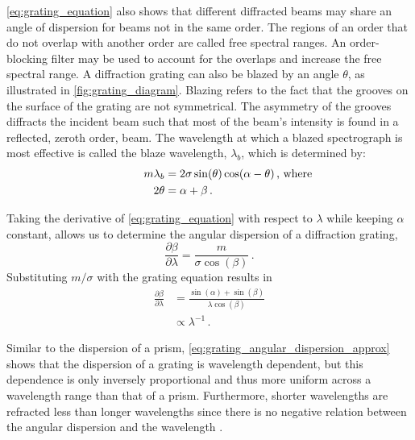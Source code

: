 \autoref{eq:grating_equation} also shows that different diffracted beams may share an angle of dispersion for beams not in the same order.
The regions of an order that do not overlap with another order are called free spectral ranges.
An order-blocking filter may be used to account for the overlaps and increase the free spectral range.
A diffraction grating can also be blazed by an angle $\theta$, as illustrated in \autoref{fig:grating_diagram}.
Blazing refers to the fact that the grooves on the surface of the grating are not symmetrical.
The asymmetry of the grooves diffracts the incident beam such that most of the beam's intensity is found in a reflected, zeroth order, beam.
The wavelength at which a blazed spectrograph is most effective is called the blaze wavelength, $\lambda_{b}$, which is determined by:
\begin{equation} \label{eq:blaze_wavelength}
    \begin{aligned}
        m\lambda_{b} &= 2\sigma\sin(\theta)\cos(\alpha - \theta)\rlap{\,,\ where}\\
        2\theta &= \alpha + \beta\,.
    \end{aligned}
\end{equation}

Taking the derivative of \autoref{eq:grating_equation} with respect to $\lambda$ while keeping $\alpha$ constant, allows us to determine the angular dispersion of a diffraction grating,
\begin{equation} \label{eq:grating_angular_dispersion}
    \frac{\partial \beta}{\partial \lambda} = \frac{m}{\sigma \cos(\beta)}\,.
\end{equation}
Substituting $m / \sigma$ with the grating equation results in
\begin{equation} \label{eq:grating_angular_dispersion_approx}
    \begin{aligned}
        \frac{\partial \beta}{\partial \lambda} &= \frac{\sin(\alpha) + \sin(\beta)}{\lambda \cos(\beta)}\\
        &\propto \lambda^{-1}\,.
    \end{aligned}
\end{equation}

Similar to the dispersion of a prism, \autoref{eq:grating_angular_dispersion_approx} shows that the dispersion of a grating is wavelength dependent, but this dependence is only inversely proportional and thus more uniform across a wavelength range than that of a prism.
Furthermore, shorter wavelengths are refracted less than longer wavelengths since there is no negative relation between the angular dispersion and the wavelength \citep{BirneyObsAstro, Hecht_optics}.

